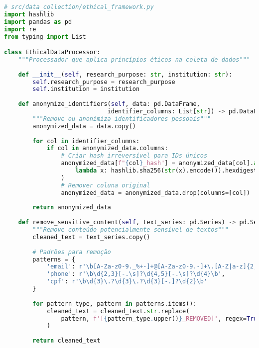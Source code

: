 \begin{pythonbox}
\begin{lstlisting}[language=Python]
# src/data_collection/ethical_framework.py
import hashlib
import pandas as pd
import re
from typing import List

class EthicalDataProcessor:
    """Processador que aplica princípios éticos na coleta de dados"""
    
    def __init__(self, research_purpose: str, institution: str):
        self.research_purpose = research_purpose
        self.institution = institution
        
    def anonymize_identifiers(self, data: pd.DataFrame, 
                             identifier_columns: List[str]) -> pd.DataFrame:
        """Remove ou anonimiza identificadores pessoais"""
        anonymized_data = data.copy()
        
        for col in identifier_columns:
            if col in anonymized_data.columns:
                # Criar hash irreversível para IDs únicos
                anonymized_data[f"{col}_hash"] = anonymized_data[col].apply(
                    lambda x: hashlib.sha256(str(x).encode()).hexdigest()[:12]
                )
                # Remover coluna original
                anonymized_data = anonymized_data.drop(columns=[col])
                
        return anonymized_data
    
    def remove_sensitive_content(self, text_series: pd.Series) -> pd.Series:
        """Remove conteúdo potencialmente sensível de textos"""
        cleaned_text = text_series.copy()
        
        # Padrões para remoção
        patterns = {
            'email': r'\b[A-Za-z0-9._%+-]+@[A-Za-z0-9.-]+\.[A-Z|a-z]{2,}\b',
            'phone': r'\b\d{2,3}[-.\s]?\d{4,5}[-.\s]?\d{4}\b',
            'cpf': r'\b\d{3}\.?\d{3}\.?\d{3}[-.]?\d{2}\b'
        }
        
        for pattern_type, pattern in patterns.items():
            cleaned_text = cleaned_text.str.replace(
                pattern, f'[{pattern_type.upper()}_REMOVED]', regex=True
            )
            
        return cleaned_text
    \end{lstlisting}
\end{pythonbox}

